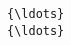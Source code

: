 \documentclass[11pt]{article}
\begin{document}
\begin{Verbatim}[commandchars=\\\{\}]
         {\ldots}                                                                                                                                                                                                                                                                                                                                                                                                                                                                                                                                                                                                                                                                                                                                                                                                                                                                                                                                                                                      {\ldots}                                                                                                                                                                                                                                                                                                                                                                                                                                                                                                                                                                                                                                                                                                                                                                                                                                                                                                                                                                                                                                                                                                                                                                                                                                                                                                                                                                                                                                                                                                                                                                                                                                                                                                                                                                                                                                                                                                                                                                                                                                                                                                                                                                                                                                                                                                                                                                                                                   
\end{Verbatim}
\end{document}
